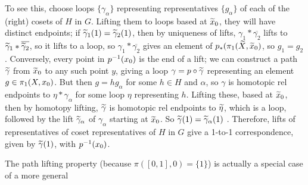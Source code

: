 To see this, choose loops 
$\{\gamma_\alpha\}$ representing representatives $\{g_\alpha\}$ of each of the (right) cosets of $H$ in $G$. Lifting them to loops based at $\widetilde{x}_0$, they will have distinct
endpoints; if $\widetilde{\gamma}_1(1)=\widetilde{\gamma}_2(1)$, then 
by uniqueness of lifts, $\gamma_1*\overline{\gamma_2}$ lifts to 
$\widetilde{\gamma}_1*\overline{\widetilde{\gamma}_2}$, so it
lifts to a loop, so $\gamma_1*\overline{\gamma_2}$ gives
an element of $p_*(\pi_1(\widetilde{X},\widetilde{x}_0)$, so $g_1=g_2$.
Conversely, every point in $p^{-1}(x_0)$ is the end of a
lift; we can construct a path $\widetilde{\gamma}$
from $\widetilde{x}_0$ to any such point $y$, giving a loop
$\gamma=p\circ \widetilde{\gamma}$ representing an element $g\in\pi_1(X,x_0)$.
But then $g=hg_\alpha$ for some $h\in H$ and $\alpha$, 
so $\gamma$ is homotopic rel endpoints to $\eta*\gamma_\alpha$ for some loop
$\eta$ representing $h$. Lifting these, based at $\widetilde{x}_0$, then by homotopy
lifting, $\widetilde{\gamma}$ is homotopic rel endpoints to $\widetilde{\eta}$, which is a 
loop, followed by the lift $\widetilde{\gamma}_\alpha$ of $\gamma_\alpha$
starting at $\widetilde{x}_0$. So $\widetilde{\gamma}(1) = \widetilde{\gamma}_\alpha(1)$ .
Therefore, lifts of representatives of coset representatives of $H$ in $G$ give
a 1-to-1 correspondence, given by $\widetilde{\gamma}(1)$, with $p^{-1}({x_0})$.


\ssk

The path lifting property (because $\pi([0,1],0)=\{1\}$) is actually a special
case of a more general 

\ssk


